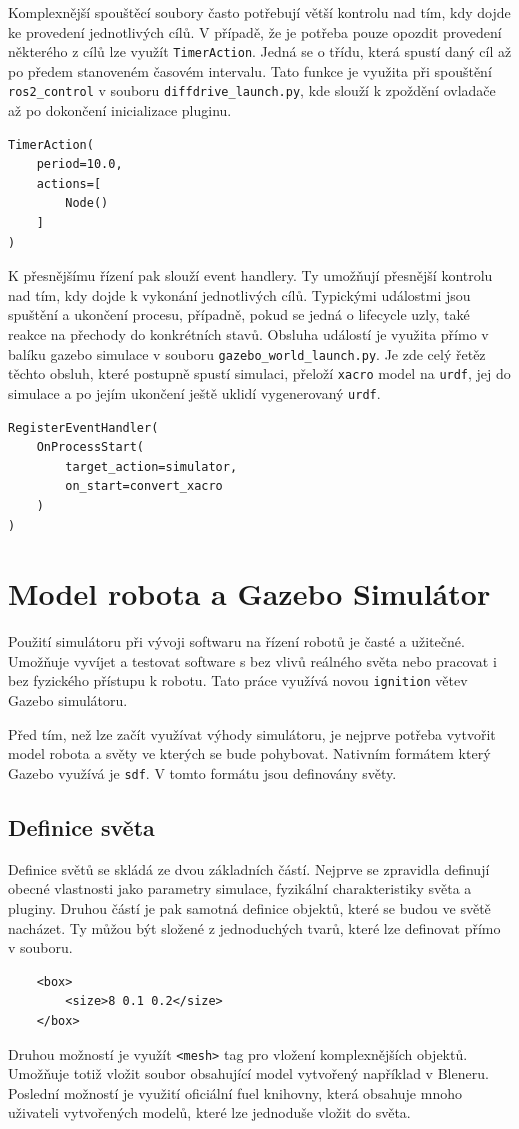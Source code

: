 Komplexnější spouštěcí soubory často potřebují větší kontrolu nad tím, kdy dojde ke provedení jednotlivých cílů. V případě, že je potřeba pouze opozdit provedení některého z cílů lze využít \verb|TimerAction|. Jedná se o třídu, která spustí daný cíl až po předem stanoveném časovém intervalu. Tato funkce je využita při spouštění \verb|ros2_control| v souboru \verb|diffdrive_launch.py|, kde slouží k zpoždění  ovladače až po dokončení inicializace pluginu.
\begin{verbatim}
TimerAction(
    period=10.0,
    actions=[
        Node()
    ]
)
\end{verbatim}

K přesnějšímu řízení pak slouží event handlery. Ty umožňují přesnější kontrolu nad tím, kdy dojde k vykonání jednotlivých cílů. Typickými událostmi jsou spuštění a ukončení procesu, případně, pokud se jedná o lifecycle uzly, také reakce na přechody do konkrétních stavů. Obsluha událostí je využita přímo v balíku gazebo simulace v souboru \verb|gazebo_world_launch.py|. Je zde celý řetěz těchto obsluh, které postupně spustí simulaci, přeloží \verb|xacro| model na \verb|urdf|,  jej do simulace a po jejím ukončení ještě uklidí vygenerovaný \verb|urdf|.
\begin{verbatim}
RegisterEventHandler(
    OnProcessStart(
        target_action=simulator,
        on_start=convert_xacro
    )
)
\end{verbatim}

\section{Model robota a Gazebo Simulátor}
Použití simulátoru při vývoji softwaru na řízení robotů je časté a užitečné. Umožňuje vyvíjet a testovat software s bez vlivů reálného světa nebo pracovat i bez fyzického přístupu k robotu. Tato práce využívá novou \verb|ignition| větev Gazebo simulátoru.

Před tím, než lze začít využívat výhody simulátoru, je nejprve potřeba vytvořit model robota a světy ve kterých se bude pohybovat. Nativním formátem který Gazebo využívá je \verb|sdf|. V tomto formátu jsou definovány světy.

\subsection*{Definice světa}
Definice světů se skládá ze dvou základních částí. Nejprve se zpravidla definují obecné vlastnosti jako parametry simulace, fyzikální charakteristiky světa a pluginy. Druhou částí je pak samotná definice objektů, které se budou ve světě nacházet. Ty můžou být složené z jednoduchých tvarů, které lze definovat přímo v souboru.
\begin{verbatim}
	<box>
		<size>8 0.1 0.2</size>
	</box>
\end{verbatim}
 Druhou možností je využít \verb|<mesh>| tag pro vložení komplexnějších objektů. Umožňuje totiž vložit soubor obsahující model vytvořený například v Bleneru. Poslední možností je využití oficiální fuel knihovny, která obsahuje mnoho uživateli vytvořených modelů, které lze jednoduše vložit do světa.

